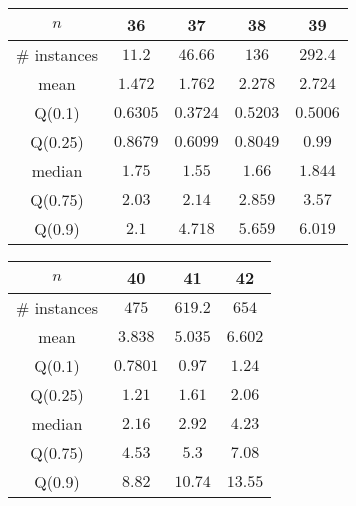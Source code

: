 \begin{tabular}{c|cccc} 
\hline 
$n$ & 36 & 37 & 38 & 39 \tabularnewline 
\hline 
\hline 
\# instances & $11.2$ & $46.66$ & $136$ & $292.4$ \tabularnewline 
mean & $1.472$ & $1.762$ & $2.278$ & $2.724$ \tabularnewline 
Q(0.1) & $0.6305$ & $0.3724$ & $0.5203$ & $0.5006$ \tabularnewline 
Q(0.25) & $0.8679$ & $0.6099$ & $0.8049$ & $0.99$ \tabularnewline 
median & $1.75$ & $1.55$ & $1.66$ & $1.844$ \tabularnewline 
Q(0.75) & $2.03$ & $2.14$ & $2.859$ & $3.57$ \tabularnewline 
Q(0.9) & $2.1$ & $4.718$ & $5.659$ & $6.019$ \tabularnewline 
\hline 
\end{tabular} 
\medskip{} 

\begin{tabular}{c|ccc} 
\hline 
$n$ & 40 & 41 & 42 \tabularnewline 
\hline 
\hline 
\# instances & $475$ & $619.2$ & $654$ \tabularnewline 
mean & $3.838$ & $5.035$ & $6.602$ \tabularnewline 
Q(0.1) & $0.7801$ & $0.97$ & $1.24$ \tabularnewline 
Q(0.25) & $1.21$ & $1.61$ & $2.06$ \tabularnewline 
median & $2.16$ & $2.92$ & $4.23$ \tabularnewline 
Q(0.75) & $4.53$ & $5.3$ & $7.08$ \tabularnewline 
Q(0.9) & $8.82$ & $10.74$ & $13.55$ \tabularnewline 
\hline 
\end{tabular} 
\medskip{} 

